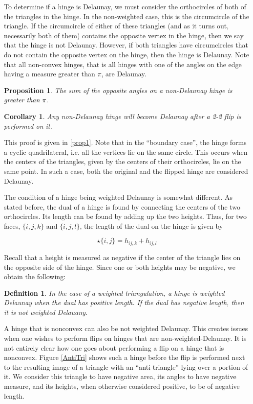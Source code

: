 \documentclass[12pt]{article}
\newtheorem{proposition}[theorem]{Proposition}
\newtheorem{corollary}[theorem]{Corollary}
\newtheorem{definition}[theorem]{Definition}
\begin{document}
 To determine if a hinge is Delaunay, we must consider the orthocircles of both of the triangles in the hinge. In the non-weighted case, this is the circumcircle of the triangle. If the circumcircle of either of these triangles (and as it turns out, necessarily both of them) contains the opposite vertex in the hinge, then we say that the hinge is not Delaunay. However, if both triangles have circumcircles that do not contain the opposite vertex on the hinge, then the hinge is Delaunay. Note that all non-convex hinges, that is all hinges with one of the angles on the edge having a measure greater than $\pi$, are Delaunay.

\begin{proposition}
\label{NonDelProp}
The sum of the opposite angles on a non-Delaunay hinge is greater than $\pi$.
\end{proposition}

\begin{corollary}
\label{FlipProp}
Any non-Delaunay hinge will become Delaunay after a 2-2 flip is performed on it.
\end{corollary}

 This proof is given in \ref{prop1}. Note that in the ``boundary case'', the hinge forms a cyclic quadrilateral, i.e. all the vertices lie on the same circle. This occurs when the centers of the triangles, given by the centers of their orthocircles, lie on the same point. In such a case, both the original and the flipped hinge are considered Delaunay.

 The condition of a hinge being weighted Delaunay is somewhat different. As stated before, the dual of a hinge is found by connecting the centers of the two orthocircles. Its length can be found by adding up the two heights. Thus, for two faces, $\{i,j,k\}$ and $\{i,j,l\}$, the length of the dual on the hinge is given by

$$\star\{i,j\} = h_{ij,k} + h_{ij,l}$$

 Recall that a height is measured as negative if the center of the triangle lies on the opposite side of the hinge. Since one or both heights may be negative, we obtain the following:
\begin{definition}
In the case of a weighted triangulation, a hinge is weighted Delaunay when the dual has positive length. If the dual has negative length, then it is not weighted Delauany. 
\end{definition}

 A hinge that is nonconvex can also be not weighted Delaunay. This creates issues when one wishes to perform flips on hinges that are non-weighted-Delaunay. It is not entirely clear how one goes about performing a flip on a hinge that is nonconvex. Figure \ref{AntiTri} shows such a hinge before the flip is performed next to the resulting image of a triangle with an ``anti-triangle'' lying over a portion of it. We consider this triangle to have negative area, its angles to have negative measure, and its heights, when otherwise considered positive, to be of negative length.
\end{document}

